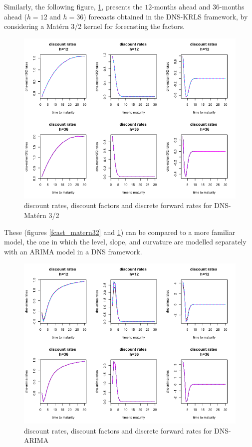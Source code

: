 Similarly, the following figure, \ref{fcast_ns_matern32}, presents the $12$-months ahead and $36$-months ahead ($h = 12$ and $h = 36$) forecasts obtained in the DNS-KRLS framework, by considering a Mat\'ern 3/2 kernel for forecasting the factors. 

\begin{figure}[!htb]
\centering
\includegraphics[width=12.5cm]{gfx/chapter-krls-models/fcast_ns_matern32}
\caption{discount rates, discount factors and discrete forward rates for DNS-Mat\'ern 3/2}
\label{fcast_ns_matern32}
\end{figure}

These (figures \ref{fcast_matern32} and \ref{fcast_ns_matern32}) can be compared to a more familiar model, the one in which the level, slope, and curvature are modelled separately with an ARIMA model in a DNS framework. 

\begin{figure}[!htb]
\centering
\includegraphics[width=12.5cm]{gfx/chapter-krls-models/fcast_ns_arima}
\caption{discount rates, discount factors and discrete forward rates for DNS-ARIMA}
\label{fcast_ns_arima}
\end{figure}

